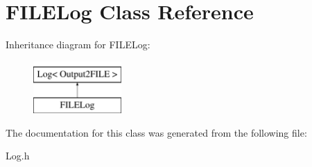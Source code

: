 \hypertarget{classFILELog}{\section{\-F\-I\-L\-E\-Log \-Class \-Reference}
\label{classFILELog}
}
\-Inheritance diagram for \-F\-I\-L\-E\-Log\-:\begin{figure}[H]
\begin{center}
\leavevmode
\includegraphics[height=2.000000cm]{classFILELog}
\end{center}
\end{figure}


\-The documentation for this class was generated from the following file\-:\begin{DoxyCompactItemize}
\item 
\-Log.\-h\end{DoxyCompactItemize}

